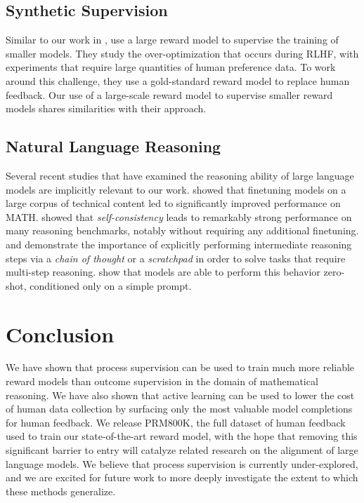 \documentclass{article}
\begin{document}
\subsection{Synthetic Supervision}

Similar to our work in , \cite{gao2022scaling} use a large reward model to supervise the training of smaller models. They study the over-optimization that occurs during RLHF, with experiments that require large quantities of human preference data. To work around this challenge, they use a gold-standard reward model to replace human feedback. Our use of a large-scale reward model to supervise smaller reward models shares similarities with their approach.

\subsection{Natural Language Reasoning}

Several recent studies that have examined the reasoning ability of large language models are implicitly relevant to our work. \cite{lewkowycz2022solving} showed that finetuning models on a large corpus of technical content led to significantly improved performance on MATH. \cite{wang2022self} showed that \textit{self-consistency} leads to remarkably strong performance on many reasoning benchmarks, notably without requiring any additional finetuning. \cite{wei2022chain} and \cite{nye2021show} demonstrate the importance of explicitly performing intermediate reasoning steps via a \textit{chain of thought} or a \textit{scratchpad} in order to solve tasks that require multi-step reasoning. \cite{kojima2022large} show that models are able to perform this behavior zero-shot, conditioned only on a simple prompt.

\section{Conclusion}

We have shown that process supervision can be used to train much more reliable reward models than outcome supervision in the domain of mathematical reasoning. We have also shown that active learning can be used to lower the cost of human data collection by surfacing only the most valuable model completions for human feedback. We release PRM800K, the full dataset of human feedback used to train our state-of-the-art reward model, with the hope that removing this significant barrier to entry will catalyze related research on the alignment of large language models. We believe that process supervision is currently under-explored, and we are excited for future work to more deeply investigate the extent to which these methods generalize.
\end{document}
